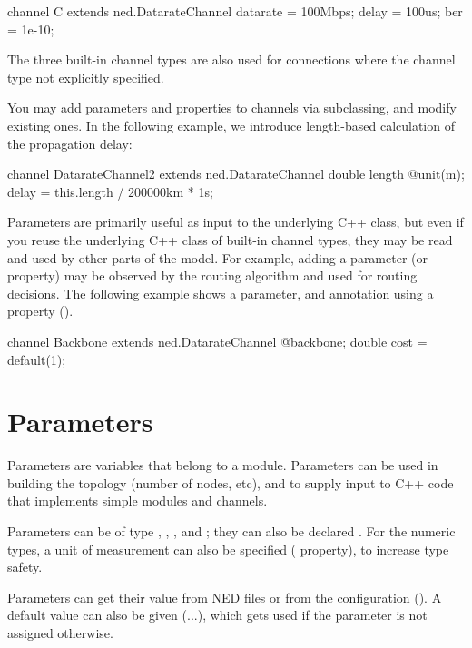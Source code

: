 \begin{ned}
channel C extends ned.DatarateChannel
{
    datarate = 100Mbps;
    delay = 100us;
    ber = 1e-10;
}
\end{ned}

\begin{note}
    The three built-in channel types are also used for connections where
    the channel type not explicitly specified.
\end{note}

You may add parameters and properties to channels via subclassing, and
modify existing ones. In the following example, we introduce length-based
calculation of the propagation delay:

\begin{ned}
channel DatarateChannel2 extends ned.DatarateChannel
{
    double length @unit(m);
    delay = this.length / 200000km * 1s;
}
\end{ned}

Parameters are primarily useful as input to the underlying C++ class, but
even if you reuse the underlying C++ class of built-in channel types, they
may be read and used by other parts of the model. For example, adding a
 parameter (or  property) may be observed by the
routing algorithm and used for routing decisions. The following example
shows a  parameter, and annotation using a property
().

\begin{ned}
channel Backbone extends ned.DatarateChannel
{
    @backbone;
    double cost = default(1);
}
\end{ned}



\section{Parameters}
\label{sec:ch-ned-lang:parameters}

Parameters are variables that belong to a module. Parameters can be
used in building the topology (number of nodes, etc), and to supply
input to C++ code that implements simple modules and channels.

Parameters can be of type , ,
,  and ; they can also
be declared . For the numeric types, a unit of
measurement can also be specified ( property), to increase
type safety.

Parameters can get their value from NED files or from the configuration
(). A default value can also be given (...\ttt{)}),
which gets used if the parameter is not assigned otherwise.

